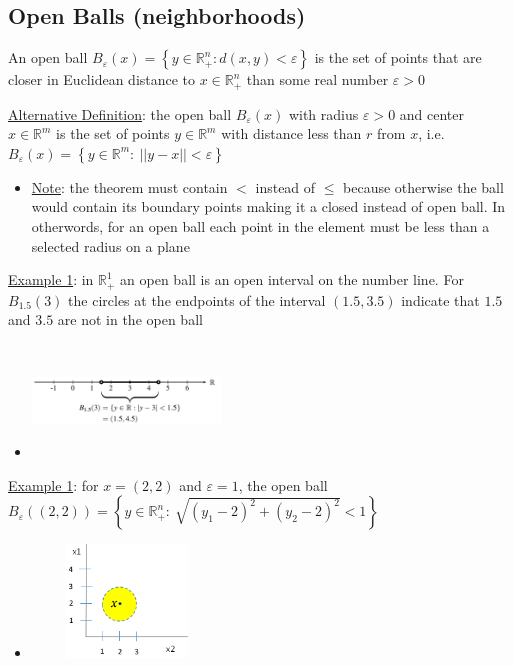 \documentclass{article}
\begin{document}
\subsection{Open Balls (neighborhoods)}
An open ball $B_{\varepsilon}(x) = \left\{ y \in \mathbb{R}_{+}^{n}: d(x,y) < \varepsilon \right\}$ is the set of points that are closer in Euclidean distance to $x \in \mathbb{R}_{+}^{n}$ than some real number $\varepsilon > 0$ \par \vspace{0.3em}
  \underline{Alternative Definition}: the open ball $B_{\varepsilon}(x)$ with radius $\varepsilon > 0$ and center $x \in \mathbb{R}^{m}$ is the set of points $y \in \mathbb{R}^{m}$ with distance less than $r$ from $x$, i.e. $B_{\varepsilon}(x) = \left\{ y \in \mathbb{R}^{m}: \ ||y - x|| < \varepsilon \right\}$
  \begin{itemize}
    \item  \underline{Note}: the theorem must contain $<$ instead of $\leq$ because otherwise the ball would contain its boundary points making it a closed instead of open ball. In otherwords, for an open ball each point in the element must be less than a selected radius on a plane
  \end{itemize}
  \par
  \underline{Example 1}: in $\mathbb{R}_{+}^{1}$ an open ball is an open interval on the number line. For $B_{1.5}(3)$ the circles at the endpoints of the interval $(1.5, 3.5)$ indicate that $1.5$ and $3.5$ are not in the open ball
  \begin{itemize}
    \item  \includegraphics[width=5cm, height=3cm]{pic2}
  \end{itemize}
  \par
  \underline{Example 1}: for $x = (2,2)$ and $\varepsilon = 1$, the open ball $B_{\varepsilon}((2,2)) = \left\{ y \in \mathbb{R}^{n}_{+}: \ \sqrt{(y_{1} - 2)^{2} + (y_{2} - 2)^{2}} < 1 \right\}$
  \begin{itemize}
    \item  \includegraphics[width=5cm, height=3cm]{pic3}
  \end{itemize}
  \par
\vspace{6mm}
\end{document}
